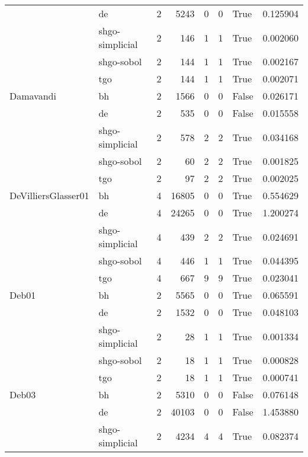 \begin{longtable}{llrrrrlr}
         & de &     2 &     5243 &      0 &       0 &    True &    0.125904 \\
         & shgo-simplicial &     2 &      146 &      1 &       1 &    True &    0.002060 \\
         & shgo-sobol &     2 &      144 &      1 &       1 &    True &    0.002167 \\
         & tgo &     2 &      144 &      1 &       1 &    True &    0.002071 \\
Damavandi & bh &     2 &     1566 &      0 &       0 &   False &    0.026171 \\
         & de &     2 &      535 &      0 &       0 &   False &    0.015558 \\
         & shgo-simplicial &     2 &      578 &      2 &       2 &    True &    0.034168 \\
         & shgo-sobol &     2 &       60 &      2 &       2 &    True &    0.001825 \\
         & tgo &     2 &       97 &      2 &       2 &    True &    0.002025 \\
DeVilliersGlasser01 & bh &     4 &    16805 &      0 &       0 &    True &    0.554629 \\
         & de &     4 &    24265 &      0 &       0 &    True &    1.200274 \\
         & shgo-simplicial &     4 &      439 &      2 &       2 &    True &    0.024691 \\
         & shgo-sobol &     4 &      446 &      1 &       1 &    True &    0.044395 \\
         & tgo &     4 &      667 &      9 &       9 &    True &    0.023041 \\
Deb01 & bh &     2 &     5565 &      0 &       0 &    True &    0.065591 \\
         & de &     2 &     1532 &      0 &       0 &    True &    0.048103 \\
         & shgo-simplicial &     2 &       28 &      1 &       1 &    True &    0.001334 \\
         & shgo-sobol &     2 &       18 &      1 &       1 &    True &    0.000828 \\
         & tgo &     2 &       18 &      1 &       1 &    True &    0.000741 \\
Deb03 & bh &     2 &     5310 &      0 &       0 &   False &    0.076148 \\
         & de &     2 &    40103 &      0 &       0 &   False &    1.453880 \\
         & shgo-simplicial &     2 &     4234 &      4 &       4 &    True &    0.082374 \\

\end{longtable}
